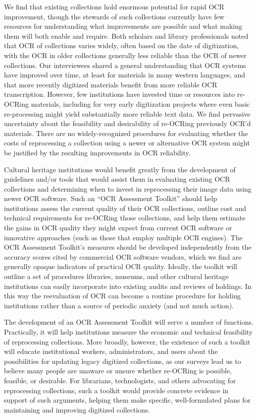 \documentclass[twoside,11pt]{report}
\begin{document}
We find that existing collections hold enormous potential for rapid OCR improvement, though the stewards of such collections currently have few resources for understanding what improvements are possible and what making them will both enable and require. Both scholars and library professionals noted that OCR of collections varies widely, often based on the date of digitization, with the OCR in older collections generally less reliable than the OCR of newer collections. Our interviewees shared a general understanding that OCR systems have improved over time, at least for materials in many western languages, and that more recently digitized materials benefit from more reliable OCR transcription. However, few institutions have invested time or resources into re-OCRing materials, including for very early digitization projects where even basic re-processing might yield substantially more reliable text data. We find pervasive uncertainty about the feasibility and desirability of re-OCRing previously OCR'd materials. There are no widely-recognized procedures for evaluating whether the costs of reprocessing a collection using a newer or alternative OCR system might be justified by the resulting improvements in OCR reliability.

Cultural heritage institutions would benefit greatly from the development of guidelines and/or tools that would assist them in evaluating existing OCR collections and determining when to invest in reprocessing their image data using newer OCR software. Such an ``OCR Assessment Toolkit'' should help institutions assess the current quality of their OCR collections, outline cost and technical requirements for re-OCRing those collections, and help them estimate the gains in OCR quality they might expect from current OCR software or innovative approaches (such as those that employ multiple OCR engines). The OCR Assessment Toolkit's measures should be developed independently from the accuracy scores cited by commercial OCR software vendors, which we find are generally opaque indicators of practical OCR quality. Ideally, the toolkit will outline a set of procedures libraries, museums, and other cultural heritage institutions can easily incorporate into existing audits and reviews of holdings. In this way the reevaluation of OCR can become a routine procedure for holding institutions rather than a source of periodic anxiety (and not much action).

The development of an OCR Assessment Toolkit will serve a number of functions. Practically, it will help institutions measure the economic and technical feasibility of reprocessing collections. More broadly, however, the existence of such a toolkit will educate institutional workers, administrators, and users about the possibilities for updating legacy digitized collections, as our surveys lead us to believe many people are unaware or unsure whether re-OCRing is possible, feasible, or desirable. For librarians, technologists, and others advocating for reprocessing collections, such a toolkit would provide concrete evidence in support of such arguments, helping them make specific, well-formulated plans for maintaining and improving digitized collections.
\end{document}
